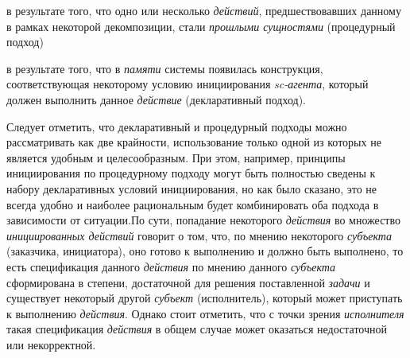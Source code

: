 \begin{SCn}
\begin{scnsubstruct}
\begin{scneqtoset}
{{\begin{scnitemize}
                        \item в результате того, что одно или несколько \textit{действий}, предшествовавших данному в рамках некоторой декомпозиции, стали \textit{прошлыми сущностями} (процедурный подход)
                        \item в результате того, что в \textit{памяти} системы появилась конструкция, соответствующая некоторому условию инициирования \textit{sc-агента}, который должен выполнить данное \textit{действие} (декларативный подход).
                    \end{scnitemize}
                    Следует отметить, что декларативный и процедурный подходы можно рассматривать как две крайности, использование только одной из которых не является удобным и целесообразным. При этом, например, принципы инициирования по процедурному подходу могут быть полностью сведены к набору декларативных условий инициирования, но как было сказано, это не всегда удобно и наиболее рациональным будет комбинировать оба подхода в зависимости от ситуации.По сути, попадание некоторого \textit{действия} во множество \textit{инициированных действий} говорит о том, что, по мнению некоторого \textit{субъекта} (заказчика, инициатора), оно готово к выполнению и должно быть выполнено, то есть спецификация данного \textit{действия} по мнению данного \textit{субъекта} сформирована в степени, достаточной для решения поставленной \textit{задачи} и существует некоторый другой \textit{субъект} (исполнитель), который может приступать к выполнению \textit{действия}. Однако стоит отметить, что с точки зрения \textit{исполнителя} такая спецификация \textit{действия} в общем случае может оказаться недостаточной или некорректной.}
            }
\end{scneqtoset}
\end{scnsubstruct}
\end{SCn}
